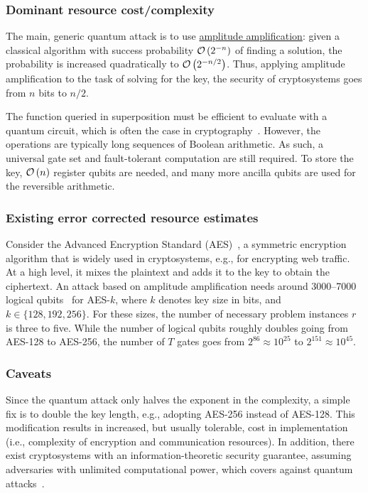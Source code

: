 \begin{refsection}
\subsubsection*{Dominant resource cost/complexity}

The main, generic quantum attack is to use \hyperref[prim:AmpAmp]{amplitude amplification}: given a classical algorithm with success probability $\mathcal{O}\left( 2^{-n} \right)$ of finding a solution, the probability is increased quadratically to $\mathcal{O}\left( 2^{-n/2} \right)$. Thus, applying amplitude amplification to the task of solving for the key, the security of cryptosystems goes from $n$ bits to $n/2$.

The function queried in superposition must be efficient to evaluate with a quantum circuit, which is often the case in cryptography~\cite{bernstein2017PostQuantumCrypto}. However, the operations are typically long sequences of Boolean arithmetic. As such, a universal gate set and fault-tolerant computation are still required. To store the key, $\mathcal{O}\left( n \right)$ register qubits are needed, and many more ancilla qubits are used for the reversible arithmetic.

\subsubsection*{Existing error corrected resource estimates}
Consider the Advanced Encryption Standard (AES)~\cite{nist2001AES}, a symmetric encryption algorithm that is widely used in cryptosystems, e.g., for encrypting web traffic. At a high level, it mixes the plaintext and adds it to the key to obtain the ciphertext. An attack based on amplitude amplification needs around 3000--7000 logical qubits~\cite{grassl2016GroverAESResourceEstimates} for AES-$k$, where $k$ denotes key size in bits, and $k\in \{128,192,256\}$. For these sizes, the number of necessary problem instances $r$ is three to five. While the number of logical qubits roughly doubles going from AES-128 to AES-256, the number of $T$ gates goes from $2^{86} \approx 10^{25}$ to $2^{151} \approx 10^{45}$.

\subsubsection*{Caveats}
Since the quantum attack only halves the exponent in the complexity, a simple fix is to double the key length, e.g., adopting AES-256 instead of AES-128. This modification results in increased, but usually tolerable, cost in implementation (i.e., complexity of encryption and communication resources). In addition, there exist cryptosystems with an information-theoretic security guarantee, assuming adversaries with unlimited computational power, which covers against quantum attacks~\cite{bernstein2017PostQuantumCrypto}.


\end{refsection}
